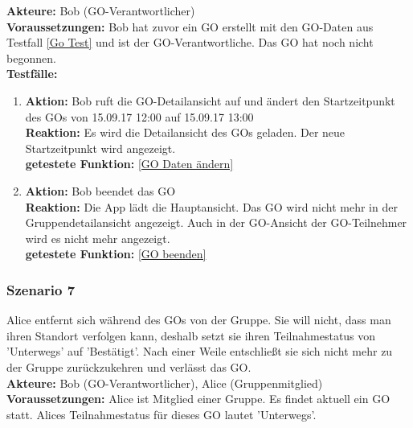 \documentclass[parskip=full]{scrartcl}
\def\threedigits#1{%
  \ifnum#1<100 0\fi
  \ifnum#1<10 0\fi
  \number#1}
\begin{document}
\textbf{Akteure:} Bob (GO-Verantwortlicher)\\

\textbf{Voraussetzungen: }Bob hat zuvor ein GO erstellt mit den GO-Daten aus Testfall \ref{Go Test} und ist der GO-Verantwortliche. Das GO hat noch nicht begonnen.\\

\textbf{Testfälle:}
\begin{enumerate}[label={\textbf{/T\protect\threedigits{\theenumi}0/}}, leftmargin=*, resume]
	\item \textbf{Aktion:} Bob ruft die GO-Detailansicht auf und ändert den Startzeitpunkt des GOs von 15.09.17 12:00 auf 15.09.17 13:00\\
	\textbf{Reaktion:} Es wird die Detailansicht des GOs geladen. Der neue Startzeitpunkt wird angezeigt.\\
	\textbf{getestete Funktion:} \ref{GO Daten ändern}
	\item \textbf{Aktion:} Bob beendet das GO\\
	\textbf{Reaktion:} Die App lädt die Hauptansicht. Das GO wird nicht mehr in der Gruppendetailansicht angezeigt. Auch in der GO-Ansicht der GO-Teilnehmer wird es nicht mehr angezeigt.\\
	\textbf{getestete Funktion:} \ref{GO beenden}
\end{enumerate}

\subsubsection*{Szenario 7}Alice entfernt sich während des GOs von der Gruppe. Sie will nicht, dass man ihren Standort verfolgen kann, deshalb setzt sie ihren Teilnahmestatus von 'Unterwegs' auf 'Bestätigt'. Nach einer Weile entschließt sie sich nicht mehr zu der Gruppe zurückzukehren und verlässt das GO.\\

\textbf{Akteure:} Bob (GO-Verantwortlicher), Alice (Gruppenmitglied)\\

\textbf{Voraussetzungen: }Alice ist Mitglied einer Gruppe. Es findet aktuell ein GO statt. Alices Teilnahmestatus für dieses GO lautet 'Unterwegs'.\\
\end{document}
